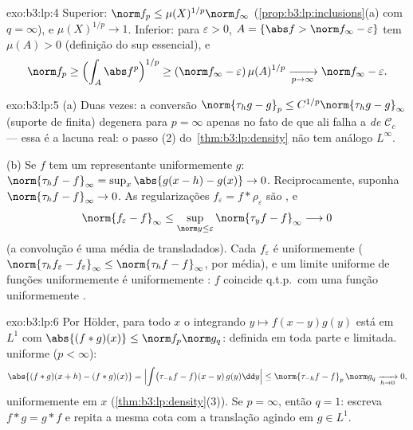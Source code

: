 \begin{solution}{exo:b3:lp:4}
Superior: $\norm f_p \leq \mu(X)^{1/p}\norm f_\infty$
(\cref{prop:b3:lp:inclusions}(a) com $q = \infty$), e
$\mu(X)^{1/p} \to 1$. Inferior: para $\varepsilon > 0$, $A =
\{\abs f > \norm f_\infty - \varepsilon\}$ tem $\mu(A) > 0$
(definição do sup essencial), e
\[
\norm f_p \geq \Bigl(\int_A \abs f^p\Bigr)^{1/p}
\geq (\norm f_\infty - \varepsilon)\,\mu(A)^{1/p}
\xrightarrow[p\to\infty]{} \norm f_\infty - \varepsilon .
\]
\end{solution}

\begin{solution}{exo:b3:lp:5}
(a) Duas vezes: a conversão $\norm{\tau_hg - g}_p \leq
C^{1/p}\norm{\tau_hg - g}_\infty$ (suporte de  finita)
degenera para $p = \infty$ apenas no fato de que ali falha a \emph{ de
$\mathcal C_c$} --- essa é a lacuna real: o passo (2)
do~\cref{thm:b3:lp:density} não tem análogo $L^\infty$.

(b) Se $f$ tem um representante uniformemente  $g$:
$\norm{\tau_hf - f}_\infty = \sup_x\abs{g(x - h) - g(x)} \to
0$. Reciprocamente, suponha $\norm{\tau_hf - f}_\infty \to 0$. As
regularizações $f_\varepsilon = f * \rho_\varepsilon$ são
, e
\[
\norm{f_\varepsilon - f}_\infty
\leq \sup_{\norm y \leq \varepsilon}\norm{\tau_yf -
f}_\infty \longrightarrow 0
\]
(a convolução é uma média de transladados). Cada
$f_\varepsilon$ é uniformemente 
($\norm{\tau_hf_\varepsilon - f_\varepsilon}_\infty \leq
\norm{\tau_hf - f}_\infty$, por média), e um limite uniforme
de funções uniformemente  é uniformemente : $f$ coincide q.t.p.\
com uma função uniformemente .
\end{solution}

\begin{solution}{exo:b3:lp:6}
Por Hölder, para todo $x$ o integrando $y \mapsto f(x -
y)g(y)$ está em $L^1$ com $\abs{(f*g)(x)} \leq \norm f_p\norm
g_q$: definida em toda parte e limitada.  uniforme ($p <
\infty$):
\[
\abs{(f*g)(x + h) - (f*g)(x)}
= \Bigl|\int\bigl(\tau_{-h}f - f\bigr)(x - y)\,g(y)\dd y\Bigr|
\leq \norm{\tau_{-h}f - f}_p\,\norm g_q
\xrightarrow[h\to0]{} 0,
\]
uniformemente em $x$ (\cref{thm:b3:lp:density}(3)). Se $p =
\infty$, então $q = 1$: escreva $f * g = g * f$ e repita a mesma
cota com a translação agindo em $g \in L^1$.
\end{solution}

